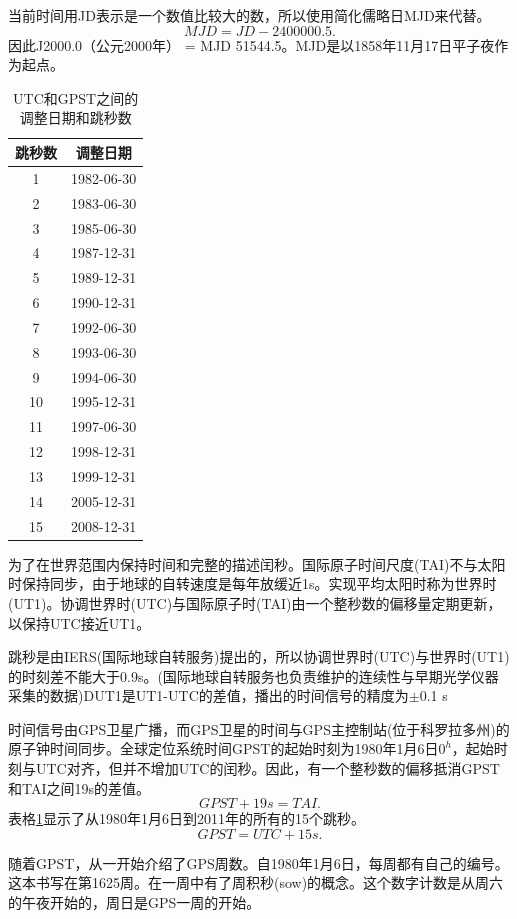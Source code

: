 	当前时间用JD表示是一个数值比较大的数，所以使用简化儒略日MJD来代替。
	$$MJD = JD-2 400 000.5.$$
	因此J2000.0（公元2000年） = MJD 51544.5。MJD是以1858年11月17日平子夜作为起点。
	\begin{table}
		\centering
		\caption{UTC和GPST之间的调整日期和跳秒数}
		\label{tab:9.2}
		\begin{tabular}{cc}
			\hline 跳秒数 & 调整日期 \\ 
			\hline  
			1 & 1982-06-30 \\ 
			2 & 1983-06-30 \\ 
			3 & 1985-06-30 \\ 
			4 & 1987-12-31 \\ 
			5 & 1989-12-31 \\ 
			6 & 1990-12-31 \\ 
			7 & 1992-06-30 \\ 
			8 & 1993-06-30 \\ 
			9 & 1994-06-30 \\ 
			10 & 1995-12-31 \\ 
			11 & 1997-06-30 \\ 
			12 & 1998-12-31 \\ 
			13 & 1999-12-31 \\ 
			14 & 2005-12-31 \\ 
			15 & 2008-12-31 \\ 
			\hline 
		\end{tabular} 
	\end{table}
	
	为了在世界范围内保持时间和完整的描述闰秒。国际原子时间尺度(TAI)不与太阳时保持同步，由于地球的自转速度是每年放缓近1s。实现平均太阳时称为世界时(UT1)。协调世界时(UTC)与国际原子时(TAI)由一个整秒数的偏移量定期更新，以保持UTC接近UT1。
	
	跳秒是由IERS(国际地球自转服务)提出的，所以协调世界时(UTC)与世界时(UT1)的时刻差不能大于0.9s。(国际地球自转服务也负责维护的连续性与早期光学仪器采集的数据)DUT1是UT1-UTC的差值，播出的时间信号的精度为$\pm$0.1 s
	
	时间信号由GPS卫星广播，而GPS卫星的时间与GPS主控制站(位于科罗拉多州)的原子钟时间同步。全球定位系统时间GPST的起始时刻为1980年1月6日$0^h$，起始时刻与UTC对齐，但并不增加UTC的闰秒。因此，有一个整秒数的偏移抵消GPST和TAI之间19s的差值。
	$$GPST + 19 s = TAI.$$
	表格\ref{tab:9.2}显示了从1980年1月6日到2011年的所有的15个跳秒。
	$$GPST = UTC + 15 s.$$
	
	随着GPST，从一开始介绍了GPS周数。自1980年1月6日，每周都有自己的编号。这本书写在第1625周。在一周中有了周积秒(sow)的概念。这个数字计数是从周六的午夜开始的，周日是GPS一周的开始。
	
